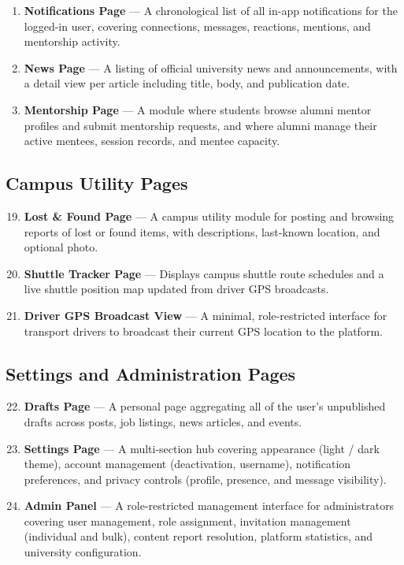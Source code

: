 \documentclass[12pt, a4paper]{article}
\begin{document}
\begin{enumerate}
    \item \textbf{Notifications Page} --- A chronological list of all in-app
    notifications for the logged-in user, covering connections, messages, reactions,
    mentions, and mentorship activity.

    \item \textbf{News Page} --- A listing of official university news and
    announcements, with a detail view per article including title, body, and
    publication date.

    \item \textbf{Mentorship Page} --- A module where students browse alumni mentor
    profiles and submit mentorship requests, and where alumni manage their active
    mentees, session records, and mentee capacity.
\end{enumerate}

\subsection{Campus Utility Pages}

\begin{enumerate}
\setcounter{enumi}{18}
    \item \textbf{Lost \& Found Page} --- A campus utility module for posting and
    browsing reports of lost or found items, with descriptions, last-known location,
    and optional photo.

    \item \textbf{Shuttle Tracker Page} --- Displays campus shuttle route schedules
    and a live shuttle position map updated from driver GPS broadcasts.

    \item \textbf{Driver GPS Broadcast View} --- A minimal, role-restricted interface
    for transport drivers to broadcast their current GPS location to the platform.
\end{enumerate}

\subsection{Settings and Administration Pages}

\begin{enumerate}
\setcounter{enumi}{21}
    \item \textbf{Drafts Page} --- A personal page aggregating all of the user's
    unpublished drafts across posts, job listings, news articles, and events.

    \item \textbf{Settings Page} --- A multi-section hub covering appearance (light
    / dark theme), account management (deactivation, username), notification
    preferences, and privacy controls (profile, presence, and message visibility).

    \item \textbf{Admin Panel} --- A role-restricted management interface for
    administrators covering user management, role assignment, invitation management
    (individual and bulk), content report resolution, platform statistics, and
    university configuration.
\end{enumerate}
\end{document}
